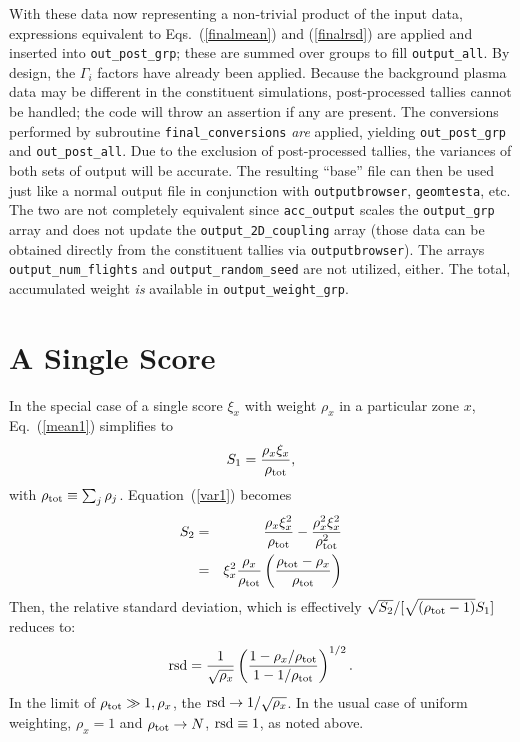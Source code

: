 \documentclass[12pt]{report}
\begin{document}
With these data now representing a non-trivial
product of the input data, expressions 
equivalent to Eqs.~(\ref{finalmean}) and
(\ref{finalrsd}) are applied and inserted
into {\tt out\_post\_grp}; these are summed over groups
to fill {\tt output\_all}.  
By design, the $\Gamma_{i}$ factors have
already been applied.  Because the 
background plasma data may be different in the
constituent simulations, post-processed tallies
cannot be handled; the code will throw an
assertion if any are present.  The conversions
performed by subroutine {\tt final\_conversions}
{\em are} applied, yielding {\tt out\_post\_grp}
and {\tt out\_post\_all}.  Due to the exclusion
of post-processed tallies, the variances of 
both sets of output will be accurate.  The
resulting ``base'' file
can then be used just like a normal output file
in conjunction with {\tt outputbrowser},
{\tt geomtesta}, etc.  The two are not completely
equivalent since {\tt acc\_output} scales the 
{\tt output\_grp} array and does 
not update the {\tt output\_2D\_coupling} array 
(those data can be obtained directly from the 
 constituent tallies via {\tt outputbrowser}). 
The arrays {\tt output\_num\_flights} and {\tt output\_random\_seed}
are not utilized, either.  The total, accumulated
weight {\em is} available in {\tt output\_weight\_grp}.

\section{A Single Score}

In the special case of a single score
$\xi_{x}$ with weight $\rho_{x}$ in
a particular zone $x$, Eq.~(\ref{mean1})
simplifies to
\begin{equation}
S_{1} = \frac{\rho_{x} \xi_{x}}{\rho_{\rm tot}},
\end{equation}
with $\rho_{\rm tot} \equiv \sum_{j} \rho_{j}$.
Equation~(\ref{var1}) becomes
\begin{eqnarray}
S_{2} & = & \frac{\rho_{x} \xi_{x}^{2}}{\rho_{\rm tot}} 
- \frac{\rho_{x}^{2} \xi_{x}^{2}}{\rho_{\rm tot}^{2}}  \\
& = &\xi_{x}^{2} \frac{\rho_{x}}{\rho_{\rm tot}} \left ( 
\frac{ \rho_{\rm tot} - \rho_{x}}{\rho_{\rm tot}} \right )
\end{eqnarray}
Then, the relative standard deviation, which is 
effectively $\sqrt{S_{2}}/[\sqrt{(\rho_{\rm tot}-1)} S_{1}]$ 
reduces to:
\begin{equation}
{\rm rsd} = \frac{1}{\sqrt{\rho_{x}}} \left ( 
\frac{1 - \rho_{x}/\rho_{\rm tot}}{1 - 1/\rho_{\rm tot}} \right )^{1/2}.
\end{equation}
In the limit of $\rho_{\rm tot} \gg 1, \rho_{x}$, 
the ${\rm rsd} \rightarrow 
1 / \sqrt{\rho_{x}}$.  In the usual case of uniform weighting,
$\rho_{x} = 1$ and $\rho_{\rm tot} \rightarrow N$, ${\rm rsd} \equiv 1$,
as noted above.
\end{document}
